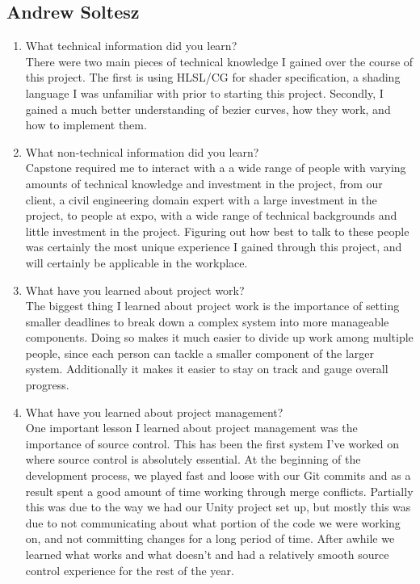 \documentclass[onecolumn, draftclsnofoot,10pt, compsoc]{IEEEtran}
\def \GroupMemberTwo{			Andrew Soltesz			}
\begin{document}
\subsection{\GroupMemberTwo}
\begin{enumerate}
\item What technical information did you learn?\\
There were two main pieces of technical knowledge I gained over the course of this project. The first is using HLSL/CG for shader specification, a shading language I was unfamiliar with prior to starting this project. Secondly, I gained a much better understanding of bezier curves, how they work, and how to implement them.

\item What non-technical information did you learn?\\
Capstone required me to interact with a a wide range of people with varying amounts of technical knowledge and investment in the project, from our client, a civil engineering domain expert with a large investment in the project, to people at expo, with a wide range of technical backgrounds and little investment in the project. Figuring out how best to talk to these people was certainly the most unique experience I gained through this project, and will certainly be applicable in the workplace. 

\item What have you learned about project work?\\
The biggest thing I learned about project work is the importance of setting smaller deadlines to break down a complex system into more manageable components. Doing so makes it much easier to divide up work among multiple people, since each person can tackle a smaller component of the larger system. Additionally it makes it easier to stay on track and gauge overall progress.

\item What have you learned about project management?\\
One important lesson I learned about project management was the importance of source control. This has been the first system I've worked on where source control is absolutely essential. At the beginning of the development process, we played fast and loose with our Git commits and as a result spent a good amount of time working through merge conflicts. Partially this was due to the way we had our Unity project set up, but mostly this was due to not communicating about what portion of the code we were working on, and not committing changes for a long period of time. After awhile we learned what works and what doesn't and had a relatively smooth source control experience for the rest of the year.


\end{enumerate}
\end{document}
